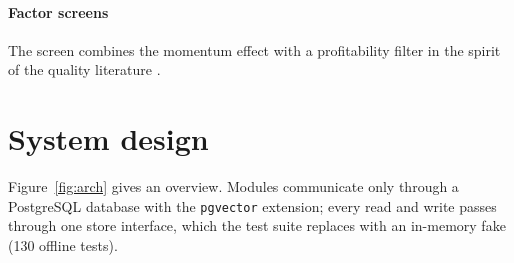 \documentclass[preprint,11pt]{elsarticle}
\newcommand{\code}[1]{\texttt{#1}}
\begin{document}
\paragraph{Factor screens} The screen combines the momentum effect \cite{jegadeesh1993returns} with a
profitability filter in the spirit of the quality literature \cite{novymarx2013other}.

\section{System design}
\label{sec:design}

Figure~\ref{fig:arch} gives an overview. Modules communicate only through a PostgreSQL database with the
\code{pgvector} extension; every read and write passes through one store interface, which the test suite
replaces with an in-memory fake (130 offline tests).
\end{document}
